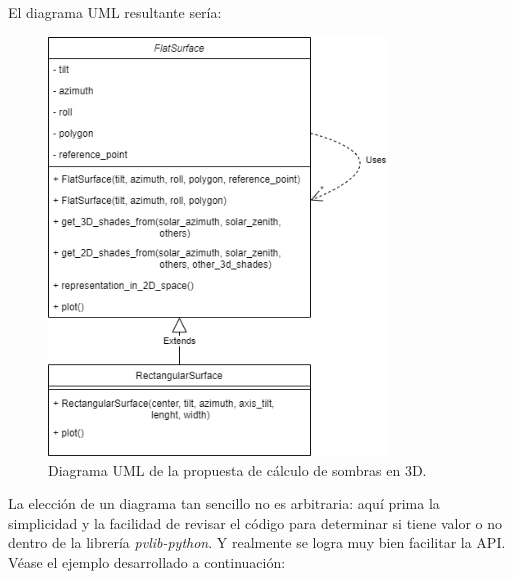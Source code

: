 El diagrama UML resultante sería:

\begin{figure}[H]
    \centering
    \includegraphics[width=0.8\textwidth]{./images/shading_3d/shading_classes.png}
    \caption{Diagrama UML de la propuesta de cálculo de sombras en 3D.}
    \label{fig:uml_sombreado}
\end{figure}

La elección de un diagrama tan sencillo no es arbitraria: aquí prima la simplicidad y la facilidad de revisar el código para determinar si tiene valor o no dentro de la librería \textit{pvlib-python}. Y realmente se logra muy bien facilitar la API. Véase el ejemplo desarrollado a continuación:

